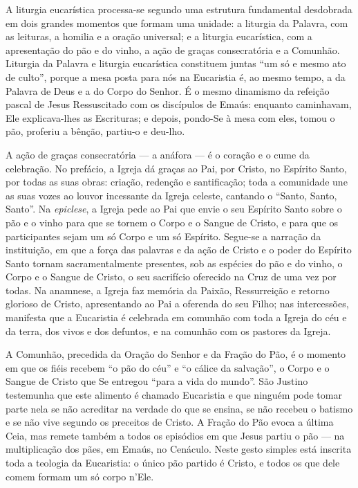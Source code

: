 A liturgia eucarística processa-se segundo uma estrutura fundamental desdobrada em dois grandes momentos que formam uma unidade: a liturgia da Palavra, com as leituras, a homilia e a oração universal; e a liturgia eucarística, com a apresentação do pão e do vinho, a ação de graças consecratória e a Comunhão. Liturgia da Palavra e liturgia eucarística constituem juntas ``um só e mesmo ato de culto'', porque a mesa posta para nós na Eucaristia é, ao mesmo tempo, a da Palavra de Deus e a do Corpo do Senhor. É o mesmo dinamismo da refeição pascal de Jesus Ressuscitado com os discípulos de Emaús: enquanto caminhavam, Ele explicava-lhes as Escrituras; e depois, pondo-Se à mesa com eles, tomou o pão, proferiu a bênção, partiu-o e deu-lho.

A ação de graças consecratória --- a anáfora --- é o coração e o cume da celebração. No prefácio, a Igreja dá graças ao Pai, por Cristo, no Espírito Santo, por todas as suas obras: criação, redenção e santificação; toda a comunidade une as suas vozes ao louvor incessante da Igreja celeste, cantando o ``Santo, Santo, Santo''. Na \emph{epiclese}, a Igreja pede ao Pai que envie o seu Espírito Santo sobre o pão e o vinho para que se tornem o Corpo e o Sangue de Cristo, e para que os participantes sejam um só Corpo e um só Espírito. Segue-se a narração da instituição, em que a força das palavras e da ação de Cristo e o poder do Espírito Santo tornam sacramentalmente presentes, sob as espécies do pão e do vinho, o Corpo e o Sangue de Cristo, o seu sacrifício oferecido na Cruz de uma vez por todas. Na anamnese, a Igreja faz memória da Paixão, Ressurreição e retorno glorioso de Cristo, apresentando ao Pai a oferenda do seu Filho; nas intercessões, manifesta que a Eucaristia é celebrada em comunhão com toda a Igreja do céu e da terra, dos vivos e dos defuntos, e na comunhão com os pastores da Igreja.

A Comunhão, precedida da Oração do Senhor e da Fração do Pão, é o momento em que os fiéis recebem ``o pão do céu'' e ``o cálice da salvação'', o Corpo e o Sangue de Cristo que Se entregou ``para a vida do mundo''. São Justino testemunha que este alimento é chamado Eucaristia e que ninguém pode tomar parte nela se não acreditar na verdade do que se ensina, se não recebeu o batismo e se não vive segundo os preceitos de Cristo. A Fração do Pão evoca a última Ceia, mas remete também a todos os episódios em que Jesus partiu o pão --- na multiplicação dos pães, em Emaús, no Cenáculo. Neste gesto simples está inscrita toda a teologia da Eucaristia: o único pão partido é Cristo, e todos os que dele comem formam um só corpo n'Ele.

